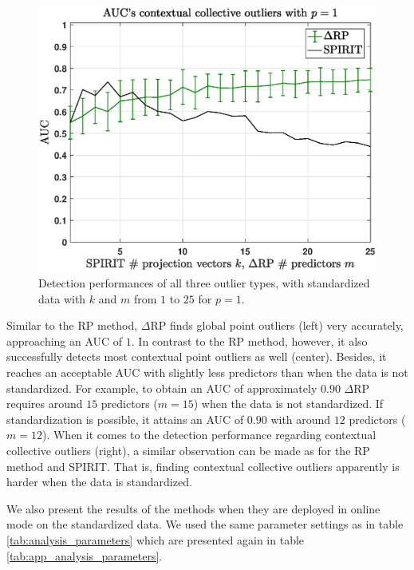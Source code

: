 \begin{figure}[h]
\begin{minipage}{0.333\textwidth}
	\end{minipage}
	\begin{minipage}{0.333\textwidth}
		\centering
		\includegraphics[scale=0.26]{analysis/AUCs_collective_spiritdelta_standardized}
	\end{minipage}
	\caption{Detection performances of all three outlier types, with standardized data with $k$ and $m$ from $1$ to $25$ for $p=1$.}
	\label{fig:app_aucs_spiritdelta_standardized}
	\vspace{0.1cm}
\end{figure}

Similar to the RP method, $\Delta$RP finds global point outliers (left) very accurately, approaching an AUC of $1$. In contrast to the RP method, however, it also successfully detects most contextual point outliers as well (center). Besides, it reaches an acceptable AUC with slightly less predictors than when the data is not standardized. For example, to obtain an AUC of approximately $0.90$ $\Delta$RP requires around $15$ predictors ($m=15$) when the data is not standardized. If standardization is possible, it attains an AUC of $0.90$ with around $12$ predictors ($m=12$). When it comes to the detection performance regarding contextual collective outliers (right), a similar observation can be made as for the RP method and SPIRIT. That is, finding contextual collective outliers apparently is harder when the data is standardized.

We also present the results of the methods when they are deployed in online mode on the standardized data. We used the same parameter settings as in table \ref{tab:analysis_parameters} which are presented again in table \ref{tab:app_analysis_parameters}. 

